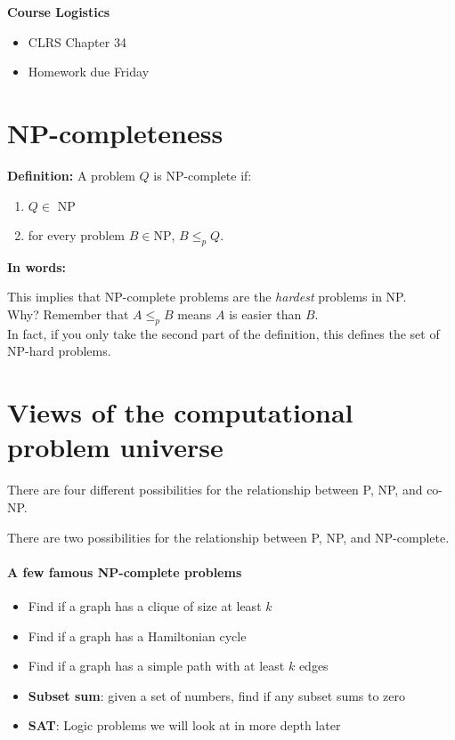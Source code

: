 \documentclass[11  pt]{article}
\begin{document}
	
	\textbf{Course Logistics}
	\begin{itemize}
		\item CLRS Chapter 34
		\item Homework due Friday
	\end{itemize}
	
	\section{NP-completeness}
	
	\textbf{Definition: } A problem $Q$ is NP-complete if:
	\begin{enumerate}
		\item $Q \in$ NP
		\item for every problem $B \in \text{NP}$, $B \leq_p Q$. \\
	\end{enumerate}
	
	\textbf{In words:} \\ %
	
	
	\vs{8cm}
	
	This implies that NP-complete problems are the \emph{hardest} problems in NP. \\
	
	
	Why? Remember that $A \leq_p B$ means $A$ is easier than $B$. \\
	
	In fact, if you only take the second part of the definition, this defines the set of NP-hard problems.
	
	
	\newpage
	
	\section{Views of the computational problem universe}
	There are four different possibilities for the relationship between P, NP, and co-NP.
	
	
	
	\vfill
	
	There are two possibilities for the relationship between P, NP, and NP-complete.
	
	\vfill
	
	\newpage
	
	\paragraph{A few famous NP-complete problems}
	\begin{itemize}
		\item Find if a graph has a clique of size at least $k$
		\item Find if a graph has a Hamiltonian cycle
		\item Find if a graph has a simple path with at least $k$ edges
		\item \textbf{Subset sum}: given a set of numbers, find if any subset sums to zero
		\item \textbf{SAT}: Logic problems we will look at in more depth later
	\end{itemize}
	
\end{document}
